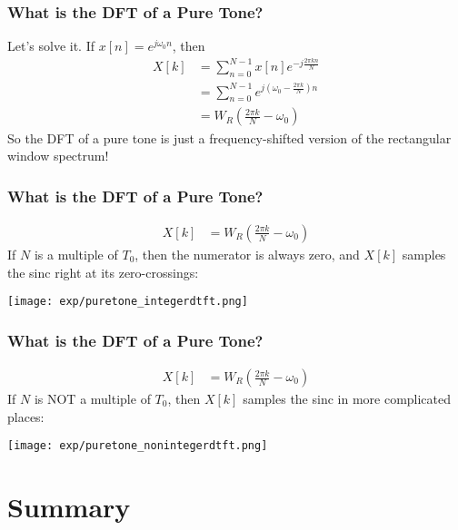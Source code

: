\documentclass{beamer}
\begin{document}
\begin{frame}
  \frametitle{What is the DFT of a Pure Tone?}

  Let's solve it.  If $x[n]=e^{j\omega_0 n}$, then
  \begin{align*}
    X[k] &= \sum_{n=0}^{N-1} x[n]e^{-j\frac{2\pi kn}{N}}\\
    &= \sum_{n=0}^{N-1} e^{j\left(\omega_0-\frac{2\pi k}{N}\right)n}\\
    &= W_R\left(\frac{2\pi k}{N}-\omega_0\right)
  \end{align*}
  So the DFT of a pure tone is just a frequency-shifted version of the
  rectangular window spectrum!
\end{frame}

\begin{frame}
  \frametitle{What is the DFT of a Pure Tone?}

  \begin{align*}
    X[k] &= W_R\left(\frac{2\pi k}{N}-\omega_0\right)
  \end{align*}
  If $N$ is a multiple of $T_0$, then the numerator is always zero, and $X[k]$ samples the sinc
  right at its zero-crossings:
  
  \centerline{\texttt{[image: exp/puretone\_integerdtft.png]}}
\end{frame}

\begin{frame}
  \frametitle{What is the DFT of a Pure Tone?}

  \begin{align*}
    X[k] &= W_R\left(\frac{2\pi k}{N}-\omega_0\right)
  \end{align*}
  If $N$ is NOT a multiple of $T_0$, then $X[k]$ samples the sinc in more complicated places:

  \centerline{\texttt{[image: exp/puretone\_nonintegerdtft.png]}}
\end{frame}

\section[Summary]{Summary}
\setcounter{subsection}{1}
\end{document}
